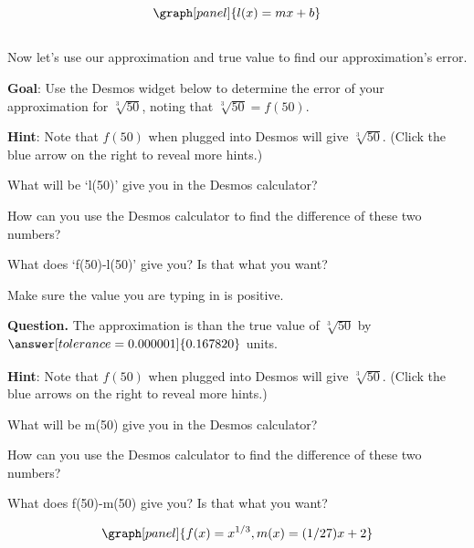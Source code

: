 \documentclass[handout,nooutcomes]{ximera}
\begin{document}
\begin{example}
\begin{explanation}
\[
\graph[panel]{l(x) = mx+b}
\]

$\phantom{.}$\\
\medskip

Now let's use our approximation and true value to find our approximation's error.

\textbf{Goal}: Use the Desmos widget below to determine the error of your approximation for $\sqrt[3]{50}$, noting that $\sqrt[3]{50} = f(50)$.\\

\bigskip

\textbf{Hint}: Note that $f(50)$ when plugged into Desmos will give $\sqrt[3]{50}$.
(Click the blue arrow on the right to reveal more hints.)

\begin{expandable}
What will be `l(50)' give you in the Desmos calculator?
\begin{expandable}
How can you use the Desmos calculator to find the difference of these two numbers?
\begin{expandable}
What does `f(50)-l(50)' give you? Is that what you want?
\begin{expandable}
Make sure the value you are typing in is positive.
\end{expandable}
\end{expandable}
\end{expandable}
\end{expandable}


\textbf{Question. } The approximation is 
than the true value of $\sqrt[3]{50}$ by $\answer[tolerance=0.000001]{0.167820}$ units.\\

$\phantom{.}$\\
\bigskip

\textbf{Hint}: Note that $f(50)$ when plugged into Desmos will give $\sqrt[3]{50}$.
(Click the blue arrows on the right to reveal more hints.)

\begin{expandable}
What will be m(50) give you in the Desmos calculator?
\begin{expandable}
How can you use the Desmos calculator to find the difference of these two numbers?
\begin{expandable}
What does f(50)-m(50) give you? Is that what you want?
\end{expandable}
\end{expandable}
\end{expandable}

\[
\graph[panel]{f(x) = x^{1/3}, m(x) = (1/27) x + 2}
\]
\end{explanation}
\end{example}
\end{document}
